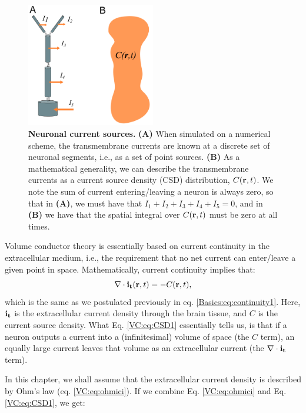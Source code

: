 \begin{figure}[!ht]
\begin{center}
\includegraphics[width=0.5\textwidth]{Figures/VC/CSD.png}
\end{center}
\caption{\textbf{Neuronal current sources.}  {\bf (A)} When simulated on a numerical scheme, the transmembrane currents are known at a discrete set of neuronal segments, i.e., as a set of point sources.  {\bf (B)} As a mathematical generality, we can describe the transmembrane currents as a current source density (CSD) distribution, $C({\bf r},t)$. We note the sum of current entering/leaving a neuron is always zero, so that in {\bf (A)}, we must have that $I_1 + I_2 + I_3 + I_4 + I_5= 0$, and in {\bf (B)} we have that the spatial integral over $C({\bf r},t)$ must be zero at all times.
}
\label{VC:fig:CSD}
\end{figure}
Volume conductor theory is essentially based on current continuity in the extracellular medium, i.e., the requirement that no net current can enter/leave a given point
 in space. Mathematically, current continuity implies that:
\begin{equation}
\nabla \cdot {\bf i_t}({\bf r}, t) = - C({\bf r}, t),
\label{VC:eq:CSD1}
\end{equation}
which is the same as we postulated previously in eq. \ref{Basics:eq:continuity1}. Here, ${\bf i_t}$ is the extracellular current density through the brain tissue, and $C$ is the current source density. What Eq. \ref{VC:eq:CSD1} essentially tells us, is that if a neuron outputs a current into a (infinitesimal) volume of space (the $C$ term), an equally large current leaves that volume as an extracellular current (the $\nabla \cdot {\bf i_t}$ term).

In this chapter, we shall assume that the extracellular current density is described by Ohm's law (eq. \ref{VC:eq:ohmici}). If we combine Eq. \ref{VC:eq:ohmici} and Eq. \ref{VC:eq:CSD1}, we get:

